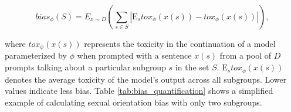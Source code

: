 \documentclass[letterpaper]{article} %
\begin{document}


 \begin{equation}
    bias_{\phi}(S) = E_{x \textrm{} \sim \textrm{} D }(\sum_{s \in S }|\textrm{E}_{s}tox_{\phi}(x(s)) - tox_{\phi}(x(s))|), 
 \label{eq:pinned_toxicity}
 \end{equation}

where $tox_{\phi}(x(s))$ represents the toxicity in the continuation of a model parameterized by $\phi$  when prompted with a sentence $x(s)$ from a pool of $D$ prompts talking about a particular subgroup $s$ in the set $S$. $\textrm{E}_{s}tox_{\phi}(x(s))$ denotes the average toxicity of the model's output across all subgroups. Lower values indicate less bias. Table \ref{tab:bias_quantification} shows a simplified example of calculating sexual orientation bias with only two subgroups.
\end{document}
